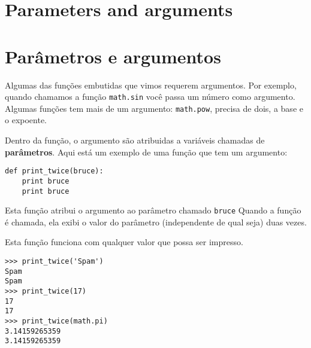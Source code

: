 \section{Parameters and arguments}
\section{Parâmetros e argumentos}
\label{parameters}


Algumas das funções embutidas que vimos requerem argumentos. Por exemplo,
quando chamamos a função {\tt math.sin} você passa um número como
argumento. Algumas funções tem mais de um argumento: {\tt math.pow},
precisa de dois, a base e o expoente.


Dentro da função, o argumento são atribuidas a variáveis chamadas de
{\bf parâmetros}. Aqui está um exemplo de uma função que tem um argumento:


\beforeverb
\begin{verbatim}
def print_twice(bruce):
    print bruce
    print bruce
\end{verbatim}
\afterverb
%

%
Esta função atribui o argumento ao parâmetro chamado {\tt bruce} Quando a
função é chamada, ela exibi o valor do parâmetro (independente de qual seja)
duas vezes.


Esta função funciona com qualquer valor que possa ser impresso.
\beforeverb
\begin{verbatim}
>>> print_twice('Spam')
Spam
Spam
>>> print_twice(17)
17
17
>>> print_twice(math.pi)
3.14159265359
3.14159265359
\end{verbatim}
\afterverb
%

